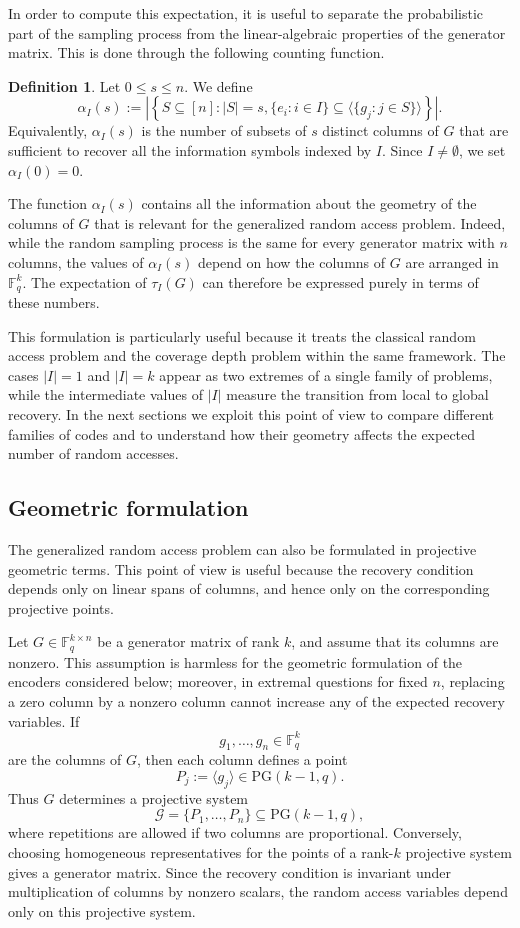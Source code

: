 \documentclass[11pt,a4paper]{article}
\numberwithin{equation}{section}
\theoremstyle{definition}
\newtheorem{definition}{Definition}[section]
\theoremstyle{definition}
\newcommand{\F}{\mathbb{F}}
\newcommand{\PG}{\mathrm{PG}}
\newcommand{\Span}{\langle}
\newcommand{\cG}{\mathcal{G}}
\begin{document}
In order to compute this expectation, it is useful to separate the probabilistic part of the sampling process from the linear-algebraic properties of the generator matrix.  This is done through the following counting function.

\begin{definition}
Let $0\leq s\leq n$.  We define
\[
\alpha_I(s):=
\left|
\left\{
S\subseteq [n] :
|S|=s,
\{e_i : i\in I\}\subseteq
\Span\{g_j : j\in S\}\rangle
\right\}
\right|.
\]
Equivalently, $\alpha_I(s)$ is the number of subsets of $s$ distinct columns of $G$ that are sufficient to recover all the information symbols indexed by $I$.  Since $I\neq\emptyset$, we set $\alpha_I(0)=0$.
\end{definition}

The function $\alpha_I(s)$ contains all the information about the geometry of the columns of $G$ that is relevant for the generalized random access problem.  Indeed, while the random sampling process is the same for every generator matrix with $n$ columns, the values of $\alpha_I(s)$ depend on how the columns of $G$ are arranged in $\F_q^k$.  The expectation of $\tau_I(G)$ can therefore be expressed purely in terms of these numbers.

This formulation is particularly useful because it treats the classical random access problem and the coverage depth problem within the same framework.  The cases $|I|=1$ and $|I|=k$ appear as two extremes of a single family of problems, while the intermediate values of $|I|$ measure the transition from local to global recovery.  In the next sections we exploit this point of view to compare different families of codes and to understand how their geometry affects the expected number of random accesses.

\subsection{Geometric formulation}\label{subsec:geometric-formulation}

The generalized random access problem can also be formulated in projective
geometric terms.  This point of view is useful because the recovery condition
depends only on linear spans of columns, and hence only on the corresponding
projective points.

Let $G\in \F_q^{k\times n}$ be a generator matrix of rank $k$, and assume
that its columns are nonzero.  This assumption is harmless for the geometric
formulation of the encoders considered below; moreover, in extremal questions
for fixed $n$, replacing a zero column by a nonzero column cannot increase any
of the expected recovery variables.  If
\[
g_1,\ldots,g_n\in \F_q^k
\]
are the columns of $G$, then each column defines a point
\[
P_j:=\langle g_j\rangle\in \PG(k-1,q).
\]
Thus $G$ determines a projective system
\[
\cG=\{P_1,\ldots,P_n\}\subseteq \PG(k-1,q),
\]
where repetitions are allowed if two columns are proportional.  Conversely,
choosing homogeneous representatives for the points of a rank-$k$ projective
system gives a generator matrix.  Since the recovery condition is invariant
under multiplication of columns by nonzero scalars, the random access variables
depend only on this projective system.
\end{document}
